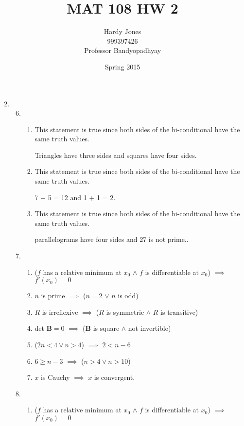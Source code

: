 \documentclass[12pt,letterpaper]{article}
\title{MAT 108 HW 2\vspace{-2ex}}
\author{Hardy Jones\\
        999397426\\
        Professor Bandyopadhyay\vspace{-2ex}}
\date{Spring 2015}
\newcommand*\biconditional[3]{
  This statement is #1 since both sides of the bi-conditional have #2 truth values.

  #3
}
\newcommand*\biconditionaltrue[2]{
  \biconditional{true}{the same}{#1 and #2.}
}
\begin{document}
  \maketitle

  \begin{enumerate}
    \setcounter{enumi}{1}
    \item
      \begin{enumerate}
        \setcounter{enumii}{5}
        \item
          \begin{enumerate}
            \item \biconditionaltrue{Triangles have three sides}{squares have four sides}
            \item \biconditionaltrue{7 + 5 = 12}{1 + 1 = 2}
            \setcounter{enumiii}{3}
            \item \biconditionaltrue{parallelograms have four sides}{27 is not prime.}
          \end{enumerate}
        \setcounter{enumii}{9}
        \item
          \begin{enumerate}
            \item
              ($f$ has a relative minimum at $x_0$ $\land$ $f$ is differentiable at $x_0$) $\implies$ $f'(x_0) = 0$
            \item
              $n$ is prime $\implies$ ($n = 2$ $\lor$ $n$ is odd)
            \item
              $R$ is irreflexive $\implies$ ($R$ is symmetric $\land$ $R$ is transitive)
            \item
              det $\mathbf{B} = 0$ $\implies$ ($\mathbf{B}$ is square $\land$ not invertible)
            \setcounter{enumiii}{5}
            \item
              ($2n < 4 \lor n > 4$) $\implies$ $2 < n - 6$
            \item
              $6 \geq n - 3$ $\implies$ ($n > 4 \lor n > 10$)
            \item
              $x$ is Cauchy $\implies$ $x$ is convergent.
          \end{enumerate}
        \setcounter{enumii}{14}
        \item
          \begin{enumerate}
            \item
              ($f$ has a relative minimum at $x_0$ $\land$ $f$ is differentiable at $x_0$) $\implies$ $f'(x_0) = 0$


\end{enumerate}
\end{enumerate}
\end{enumerate}
\end{document}

